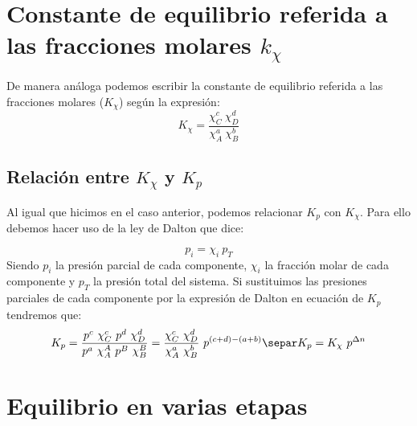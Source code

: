     \section{Constante de equilibrio referida a las fracciones molares \texorpdfstring{\(k_\chi\)}{kx}}\label{sec:constante-de-equilibrio-referida-a-las-fracciones-molares}

    \setcounter{ejemplo}{0}

    De manera análoga podemos escribir la constante de equilibrio referida a las fracciones molares (\(K_{\chi}\)) según la expresión:
    \begin{equation}
        K_{\chi} = \dfrac{\chi_C^c\ \chi_D^d}{\chi_A^a\ \chi_B^b}
        \label{eq:constante-fracciones-molares}
    \end{equation}

    \subsection{Relación entre \texorpdfstring{\(K_\chi\)}{Kx} y \texorpdfstring{\(K_p\)}{Kp}}\label{subsec:relacion-entre-kx-y-kp}

    Al igual que hicimos en el caso anterior, podemos relacionar \(K_p\) con \(K_\chi\).
    Para ello debemos hacer uso de la ley de Dalton que dice:

    \begin{equation}
        p_i = \chi_i\ p_T
    \end{equation}
    Siendo \(p_i\) la presión parcial de cada componente, \(\chi_i\) la fracción molar de cada componente y \(p_T\) la presión total del sistema.
    Si sustituimos las presiones parciales de cada componente por la expresión de Dalton en ecuación de \(K_p\) tendremos que:
    \begin{gather}
        K_p = \dfrac{p^c\ \chi_C^c\ p^d\ \chi_D^d}{p^a\ \chi_A^A\ p^B\ \chi_B^B} = \dfrac{\chi_C^c\ \chi_D^d}{\chi_A^a\ \chi_B^b}\ p^{(c+d)-(a+b)} \notag\separ
        K_p = K_\chi\ p^{\Delta n} \label{eq:relacion-Kp-Kx}
    \end{gather}


    \section{Equilibrio en varias etapas}\label{sec:equilibrio-en-varias-etapas}

